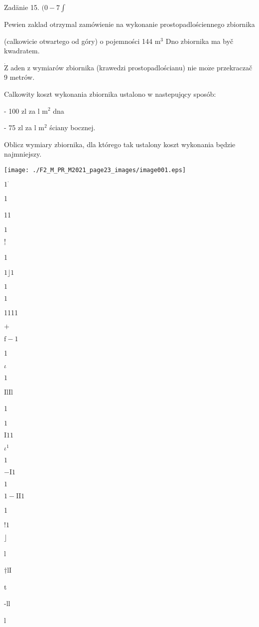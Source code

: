 \documentclass[a4paper,12pt]{article}
\begin{document}
Zadänie 15. $(0-7\displaystyle \int$

Pewien zaklad otrzymal zamówienie na wykonanie prostopadlościennego zbiornika

(calkowicie otwartego od góry) o pojemności 144 $\mathrm{m}^{3}$ Dno zbiornika ma byč kwadratem.

$\dot{\mathrm{Z}}$ aden z wymiarów zbiornika (krawedzi prostopadlościanu) nie $\mathrm{m}\mathrm{o}\dot{\mathrm{z}}\mathrm{e}$ przekraczač 9 metrów.

Calkowity koszt wykonania zbiornika ustalono w nastepujqcy sposób:

- 100 zl za l $\mathrm{m}^{2}$ dna

- 75 zl za l $\mathrm{m}^{2}$ ściany bocznej.

Oblicz wymiary zbiornika, dla którego tak ustalony koszt wykonania będzie najmniejszy.
\begin{center}
\texttt{[image: ./F2\_M\_PR\_M2021\_page23\_images/image001.eps]}
\end{center}
$1^{\cdot}$

1

11

$1$

$\underline{!}$

1

$1 \rfloor 1$

$1$

$1$

1111

$+$

$\mathrm{f}-1$

1

$\iota$

$1$

IlIl

1

$1$

$\mathrm{I}11$

$\iota^{1}$

$1$

$-\mathrm{I}1$

$1$

$1-\mathrm{I}\mathrm{I}1$

1

$!1$

$\rfloor$

l

$\dagger$lI

t

-ll

l
\end{document}
